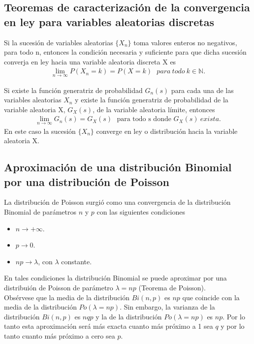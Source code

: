 \subsection{Teoremas de caracterización de la convergencia en ley para variables aleatorias discretas}

\begin{teo}
Si la sucesión de variables aleatorias $\{X_n\}$ toma valores enteros no negativos, para todo n, entonces la condición necesaria y suficiente para que dicha sucesión converja en ley hacia una variable aleatoria discreta X es
\begin{align*}
    \lim_{n \to \infty}{P(X_n = k) = P(X = k)} \ \ \ para \ todo \ k \in \mathbb{N}.
\end{align*}
\end{teo}

\begin{teo}
Si existe la función generatriz de probabilidad $G_n(s)$ para cada una de las variables aleatorias $X_n$ y existe la función generatriz de probabilidad de la variable aleatoria X, $G_X(s)$, de la variable aleatoria límite, entonces
\begin{align*}
    \lim_{n \to \infty}{G_n(s) = G_X(s)} \ \ \ \text{para todo s donde } G_X(s) \ exista.
\end{align*}
En este caso la sucesión $\{X_n\}$ converge en ley o distribución hacia la variable aleatoria X.
\end{teo}

\subsection{Aproximación de una distribución Binomial por una distribución de Poisson}

La distribución de Poisson surgió como una convergencia de la distribución Binomial de parámetros $n$ y $p$ con las siguientes condiciones
\begin{itemize}
    \item $n \to +\infty$.
    \item $p \to 0$.
    \item $np \to \lambda$, con $\lambda$ constante.
\end{itemize}
En tales condiciones la distribución Binomial se puede aproximar por una distribuión de Poisson de parámetro $\lambda = np$ (Teorema de Poisson).
\\
\newline
Obsérvese que la media de la distribución $Bi(n,p)$ es $np$ que coincide con la media de la distribución $Po(\lambda = np)$. Sin embargo, la varianza de la distribución $Bi(n,p)$ es $nqp$ y la de la distribución $Po(\lambda = np)$ es $np$. Por lo tanto esta aproximación será más exacta cuanto más próximo a 1 sea $q$ y por lo tanto cuanto más próximo a cero sea $p$.

